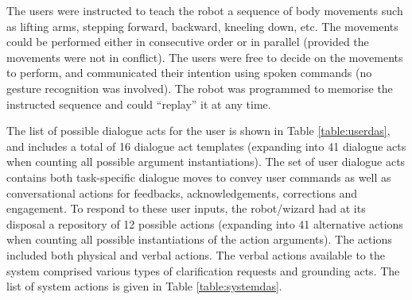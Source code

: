 The users were instructed to teach the robot a sequence of body movements such as lifting arms, stepping forward, backward, kneeling down, etc.  The movements could be performed either in consecutive order or in parallel (provided the movements were not in conflict).  The users were free to decide on the movements to perform, and communicated their intention using spoken commands (no gesture recognition was involved).  The robot was programmed to memorise the instructed sequence and could ``replay'' it at any time.

The list of possible dialogue acts for the user is shown in Table \ref{table:userdas}, and includes a total of 16 dialogue act templates (expanding into 41 dialogue acts when counting all possible argument instantiations). The set of user dialogue acts contains both task-specific dialogue moves to convey user commands as well as conversational actions for feedbacks, acknowledgements, corrections and engagement.  To respond to these user inputs, the robot/wizard had at its disposal a repository of 12 possible actions (expanding into 41 alternative actions when counting all possible instantiations of the action arguments).  The actions included both physical and verbal actions. The verbal actions available to the system comprised various types of clarification requests and grounding acts. The list of system actions is given in Table \ref{table:systemdas}. 

\renewcommand{\arraystretch}{1.3}

